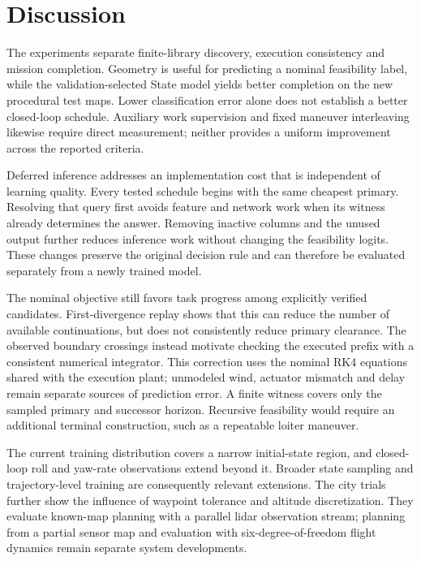 \documentclass[journal]{IEEEtran}
\begin{document}
\section{Discussion}
The experiments separate finite-library discovery, execution consistency and mission completion. Geometry is useful for predicting a nominal feasibility label, while the validation-selected State model yields better completion on the new procedural test maps. Lower classification error alone does not establish a better closed-loop schedule. Auxiliary work supervision and fixed maneuver interleaving likewise require direct measurement; neither provides a uniform improvement across the reported criteria.

Deferred inference addresses an implementation cost that is independent of learning quality. Every tested schedule begins with the same cheapest primary. Resolving that query first avoids feature and network work when its witness already determines the answer. Removing inactive columns and the unused output further reduces inference work without changing the feasibility logits. These changes preserve the original decision rule and can therefore be evaluated separately from a newly trained model.

The nominal objective still favors task progress among explicitly verified candidates. First-divergence replay shows that this can reduce the number of available continuations, but does not consistently reduce primary clearance. The observed boundary crossings instead motivate checking the executed prefix with a consistent numerical integrator. This correction uses the nominal RK4 equations shared with the execution plant; unmodeled wind, actuator mismatch and delay remain separate sources of prediction error. A finite witness covers only the sampled primary and successor horizon. Recursive feasibility would require an additional terminal construction, such as a repeatable loiter maneuver.

The current training distribution covers a narrow initial-state region, and closed-loop roll and yaw-rate observations extend beyond it. Broader state sampling and trajectory-level training are consequently relevant extensions. The city trials further show the influence of waypoint tolerance and altitude discretization. They evaluate known-map planning with a parallel lidar observation stream; planning from a partial sensor map and evaluation with six-degree-of-freedom flight dynamics remain separate system developments.
\onecolumn
\twocolumn
\end{document}
